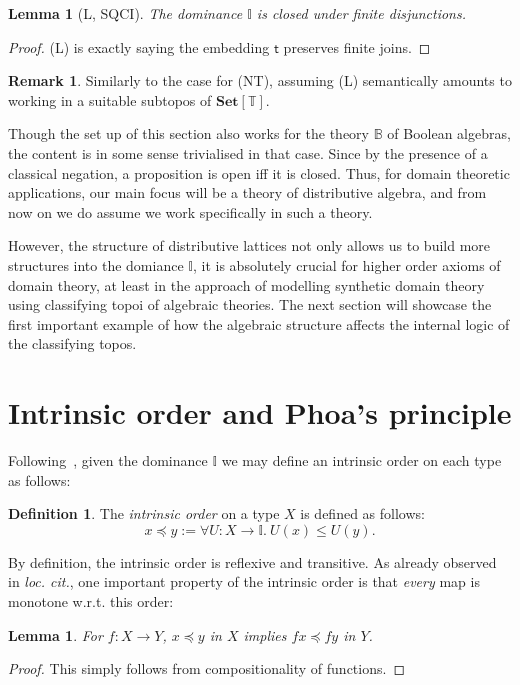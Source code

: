 \documentclass[12pt]{amsart}
\newtheorem{lemma}[theorem]{Lemma}
\theoremstyle{definition}
\newtheorem{definition}[theorem]{Definition}
\newtheorem{remark}[theorem]{Remark}
\newcommand{\mb}[1]{\mathbf{#1}}
\newcommand{\mbb}[1]{\mathbb{#1}}
\newcommand{\T}{\mbb T}
\newcommand{\I}{\mbb I}
\newcommand{\ms}[1]{\mathsf{#1}}
\newcommand{\Set}{\mb{Set}}
\newcommand{\fa}[2]{\forall #1\!\colon\!\!#2.\ }
\begin{document}
\begin{lemma}[L, SQCI]
  The dominance $\I$ is closed under finite disjunctions.
\end{lemma}
\begin{proof}
  (L) is exactly saying the embedding $\ms t$ preserves finite joins.
\end{proof}

\begin{remark}
  Similarly to the case for (NT), assuming (L) semantically amounts to working in a suitable subtopos of $\Set[\T]$.
\end{remark}

Though the set up of this section also works for the theory $\mbb B$ of Boolean algebras, the content is in some sense trivialised in that case. Since by the presence of a classical negation, a proposition is open iff it is closed. Thus, for domain theoretic applications, our main focus will be a theory of distributive algebra, and from now on we do assume we work specifically in such a theory.

However, the structure of distributive lattices not only allows us to build more structures into the domiance $\I$, it is absolutely crucial for higher order axioms of domain theory, at least in the approach of modelling synthetic domain theory using classifying topoi of algebraic theories. The next section will showcase the first important example of how the algebraic structure affects the internal logic of the classifying topos.

\section{Intrinsic order and Phoa's principle}

Following~\cite{hyland2006first}, given the dominance $\I$ we may define an intrinsic order on each type as follows:

\begin{definition}
  The \emph{intrinsic order} on a type $X$ is defined as follows:
  \[ x \preceq y := \fa{U}{X\to\I} U(x) \le U(y). \]
\end{definition}

By definition, the intrinsic order is reflexive and transitive. As already observed in \emph{loc. cit.}, one important property of the intrinsic order is that \emph{every} map is monotone w.r.t. this order:

\begin{lemma}\label{lem:anymapmonotoneintriscorder}
  For $f : X \to Y$, $x \preceq y$ in $X$ implies $fx \preceq fy$ in $Y$.
\end{lemma}
\begin{proof}
  This simply follows from compositionality of functions.
\end{proof}
\end{document}
